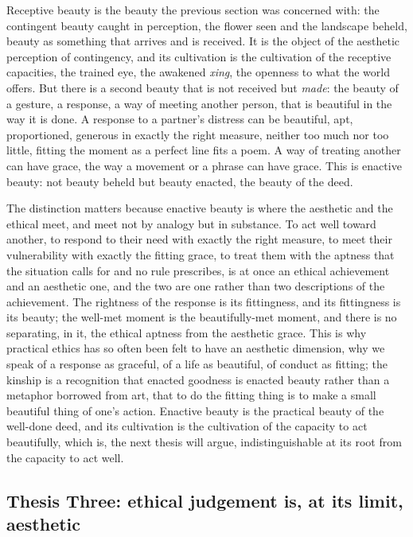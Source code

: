 \noindent
Receptive beauty is the beauty the previous section was concerned with: the contingent beauty caught in perception, the flower seen and the landscape beheld, beauty as something that arrives and is received. It is the object of the aesthetic perception of contingency, and its cultivation is the cultivation of the receptive capacities, the trained eye, the awakened \emph{xing}, the openness to what the world offers. But there is a second beauty that is not received but \emph{made}: the beauty of a gesture, a response, a way of meeting another person, that is beautiful in the way it is done. A response to a partner's distress can be beautiful, apt, proportioned, generous in exactly the right measure, neither too much nor too little, fitting the moment as a perfect line fits a poem. A way of treating another can have grace, the way a movement or a phrase can have grace. This is enactive beauty: not beauty beheld but beauty enacted, the beauty of the deed.

The distinction matters because enactive beauty is where the aesthetic and the ethical meet, and meet not by analogy but in substance. To act well toward another, to respond to their need with exactly the right measure, to meet their vulnerability with exactly the fitting grace, to treat them with the aptness that the situation calls for and no rule prescribes, is at once an ethical achievement and an aesthetic one, and the two are one rather than two descriptions of the achievement. The rightness of the response is its fittingness, and its fittingness is its beauty; the well-met moment is the beautifully-met moment, and there is no separating, in it, the ethical aptness from the aesthetic grace. This is why practical ethics has so often been felt to have an aesthetic dimension, why we speak of a response as graceful, of a life as beautiful, of conduct as fitting; the kinship is a recognition that enacted goodness is enacted beauty rather than a metaphor borrowed from art, that to do the fitting thing is to make a small beautiful thing of one's action. Enactive beauty is the practical beauty of the well-done deed, and its cultivation is the cultivation of the capacity to act beautifully, which is, the next thesis will argue, indistinguishable at its root from the capacity to act well.

\subsection{Thesis Three: ethical judgement is, at its limit, aesthetic}
\label{p21:sub:ae-thesis3}

